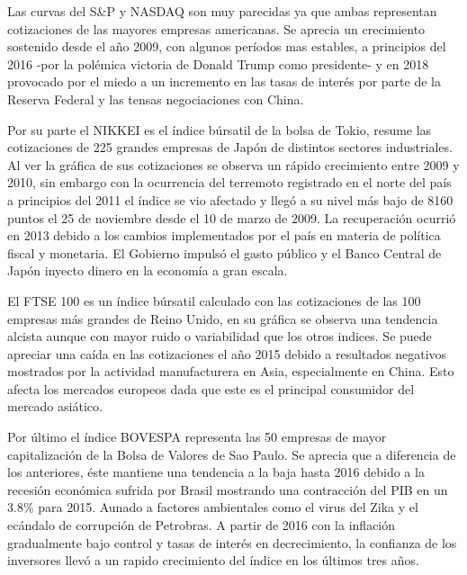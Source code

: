 \documentclass[a4paper,12pt]{Latex/Classes/PhDthesisPSnPDF}
\begin{document}
Las curvas del S\&P y NASDAQ son muy parecidas ya que ambas representan cotizaciones de las mayores empresas americanas. Se aprecia un crecimiento sostenido desde el año 2009, con algunos períodos mas estables, a principios del 2016 -por la polémica victoria de Donald Trump como presidente- y en 2018 provocado por el miedo a un incremento en las tasas de interés por parte de la Reserva Federal y las tensas negociaciones con China.

Por su parte el NIKKEI es el índice búrsatil de la bolsa de Tokio, resume las cotizaciones de 225 grandes empresas de Japón de distintos sectores industriales. Al ver la gráfica de sus cotizaciones se observa un rápido crecimiento entre 2009 y 2010, sin embargo con la ocurrencia del terremoto registrado en el norte del país a principios del 2011 el índice se vio afectado y llegó a su nivel más bajo de 8160 puntos el 25 de noviembre desde el 10 de marzo de 2009. La recuperación ocurrió en 2013 debido a los cambios implementados por el país en materia de política fiscal y monetaria. El Gobierno impulsó el gasto público y el Banco Central de Japón inyecto dinero en la economía a gran escala.

El FTSE 100 es un índice búrsatil calculado con las cotizaciones de las 100 empresas más grandes de Reino Unido, en su gráfica se observa una tendencia alcista aunque con mayor ruido o variabilidad que los otros indices. Se puede apreciar una caída en las cotizaciones el año 2015 debido a resultados negativos mostrados por la actividad manufacturera en Asia, especialmente en China. Esto afecta los mercados europeos dada que este es el principal consumidor del mercado asiático.

Por último el índice BOVESPA representa las 50 empresas de mayor capitalización de la Bolsa de Valores de Sao Paulo. Se aprecia que a diferencia de los anteriores, éste mantiene una tendencia a la baja hasta 2016 debido a la recesión económica sufrida por Brasil mostrando una contracción del PIB en un 3.8\% para 2015. Aunado a factores ambientales como el virus del Zika y el ecándalo de corrupción de Petrobras. A partir de 2016 con la inflación gradualmente bajo control y tasas de interés en decrecimiento, la confianza de los inversores llevó a un rapido crecimiento del índice en los últimos tres años.
\end{document}
